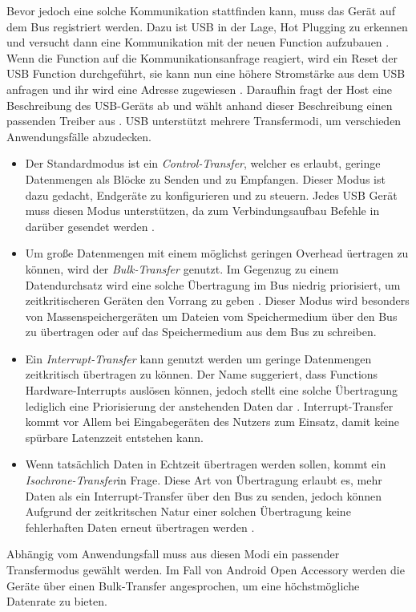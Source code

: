 	Bevor jedoch eine solche Kommunikation stattfinden kann, muss das Gerät auf dem Bus registriert werden. Dazu ist USB in der Lage, Hot Plugging zu erkennen und versucht dann eine Kommunikation mit der neuen Function aufzubauen \cite[S.45]{Kelm}. Wenn die Function auf die Kommunikationsanfrage reagiert, wird ein Reset der USB Function durchgeführt, sie kann nun eine höhere Stromstärke aus dem USB anfragen und ihr wird eine Adresse zugewiesen \cite[S.94f]{Kelm}. Daraufhin fragt der Host eine Beschreibung des USB-Geräts ab und wählt anhand dieser Beschreibung einen passenden Treiber aus \cite[S.95]{Kelm}. USB unterstützt mehrere Transfermodi, um verschieden Anwendungsfälle abzudecken. 
	\begin{itemize}
	\item Der Standardmodus ist ein {\it Control-Transfer}, welcher es erlaubt, geringe Datenmengen als Blöcke zu Senden und zu Empfangen. Dieser Modus ist dazu gedacht, Endgeräte zu konfigurieren und zu steuern. Jedes USB Gerät muss diesen Modus unterstützen, da zum Verbindungsaufbau Befehle in darüber gesendet werden \cite[S.79]{axelson}.
	\item Um große Datenmengen mit einem möglichst geringen Overhead üertragen zu können, wird der {\it Bulk-Transfer} genutzt. Im Gegenzug zu einem Datendurchsatz wird eine solche Übertragung im Bus niedrig priorisiert, um zeitkritischeren Geräten den Vorrang zu geben \cite[S.85]{axelson}. Dieser Modus wird besonders von Massenspeichergeräten um Dateien vom Speichermedium über den Bus zu übertragen oder auf das Speichermedium aus dem Bus zu schreiben.
	\item Ein {\it Interrupt-Transfer} kann genutzt werden um geringe Datenmengen zeitkritisch übertragen zu können. Der Name suggeriert, dass Functions Hardware-Interrupts auslösen können, jedoch stellt eine solche Übertragung lediglich eine Priorisierung der anstehenden Daten dar \cite[S.88]{axelson}. Interrupt-Transfer kommt vor Allem bei Eingabegeräten des Nutzers zum Einsatz, damit keine spürbare Latenzzeit entstehen kann.
	\item  Wenn tatsächlich Daten in Echtzeit übertragen werden sollen, kommt ein {\it Isochrone-Transfer}in Frage. Diese Art von Übertragung erlaubt es, mehr Daten als ein Interrupt-Transfer über den Bus zu senden, jedoch können Aufgrund der zeitkritschen Natur einer solchen Übertragung keine fehlerhaften Daten erneut übertragen werden \cite[S.85]{axelson}.
	\end{itemize}
	Abhängig vom Anwendungsfall muss aus diesen Modi ein passender Transfermodus gewählt werden. Im Fall von Android Open Accessory werden die Geräte über einen Bulk-Transfer angesprochen, um eine höchstmögliche Datenrate zu bieten.
